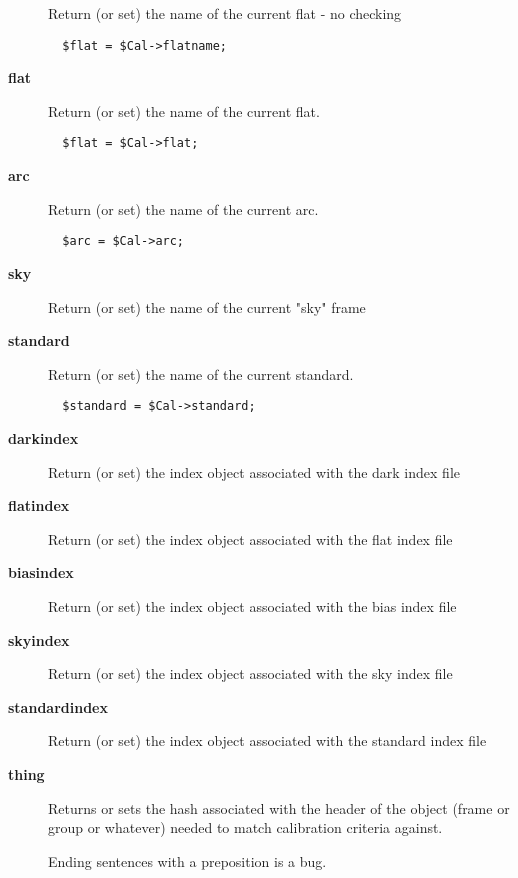 \begin{description}
Return (or set) the name of the current flat - no checking

\begin{verbatim}
  $flat = $Cal->flatname;
\end{verbatim}
\item[\textbf{flat}] \mbox{}

Return (or set) the name of the current flat.

\begin{verbatim}
  $flat = $Cal->flat;
\end{verbatim}
\item[\textbf{arc}] \mbox{}

Return (or set) the name of the current arc.

\begin{verbatim}
  $arc = $Cal->arc;
\end{verbatim}
\item[\textbf{sky}] \mbox{}

Return (or set) the name of the current "sky" frame

\item[\textbf{standard}] \mbox{}

Return (or set) the name of the current standard.

\begin{verbatim}
  $standard = $Cal->standard;
\end{verbatim}
\item[\textbf{darkindex}] \mbox{}

Return (or set) the index object associated with the dark index file

\item[\textbf{flatindex}] \mbox{}

Return (or set) the index object associated with the flat index file

\item[\textbf{biasindex}] \mbox{}

Return (or set) the index object associated with the bias index file

\item[\textbf{skyindex}] \mbox{}

Return (or set) the index object associated with the sky index file

\item[\textbf{standardindex}] \mbox{}

Return (or set) the index object associated with the standard index file

\item[\textbf{thing}] \mbox{}

Returns or sets the hash associated with the header of the object
(frame or group or whatever) needed to match calibration criteria
against.



Ending sentences with a preposition is a bug.

\end{description}
